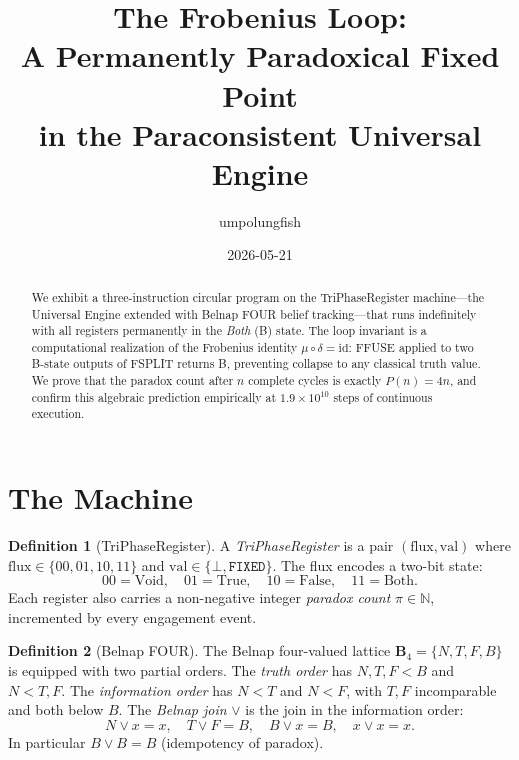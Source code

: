 \documentclass[12pt,a4paper]{article}
\theoremstyle{definition}
\newtheorem{definition}{Definition}
\theoremstyle{remark}
\begin{document}
\title{The Frobenius Loop:\\
A Permanently Paradoxical Fixed Point\\
in the Paraconsistent Universal Engine}
\author{umpolungfish}
\date{2026-05-21}
\maketitle

\begin{abstract}
We exhibit a three-instruction circular program on the TriPhaseRegister
machine---the Universal Engine extended with Belnap FOUR belief
tracking---that runs indefinitely with all registers permanently in the
\emph{Both} (B) state.  The loop invariant is a computational realization of
the Frobenius identity $\mu \circ \delta = \mathrm{id}$: FFUSE applied to two
B-state outputs of FSPLIT returns B, preventing collapse to any classical
truth value.  We prove that the paradox count after $n$ complete cycles is
exactly $P(n) = 4n$, and confirm this algebraic prediction empirically at
$1.9 \times 10^{10}$ steps of continuous execution.
\end{abstract}

\section{The Machine}

\begin{definition}[TriPhaseRegister]
A \emph{TriPhaseRegister} is a pair $(\mathrm{flux}, \mathrm{val})$ where
$\mathrm{flux} \in \{00, 01, 10, 11\}$ and $\mathrm{val} \in \{\bot,
\texttt{FIXED}\}$.  The flux encodes a two-bit state:
\[
  00 = \text{Void},\quad
  01 = \text{True},\quad
  10 = \text{False},\quad
  11 = \text{Both}.
\]
Each register also carries a non-negative integer \emph{paradox count}
$\pi \in \mathbb{N}$, incremented by every engagement event.
\end{definition}

\begin{definition}[Belnap FOUR]
The Belnap four-valued lattice $\mathbf{B}_4 = \{N, T, F, B\}$ is equipped
with two partial orders.  The \emph{truth order} has $N, T, F < B$ and $N <
T, F$.  The \emph{information order} has $N < T$ and $N < F$, with $T, F$
incomparable and both below $B$.  The \emph{Belnap join} $\vee$ is the join
in the information order:
\[
  N \vee x = x,\quad T \vee F = B,\quad B \vee x = B,\quad x \vee x = x.
\]
In particular $B \vee B = B$ (idempotency of paradox).
\end{definition}
\end{document}

